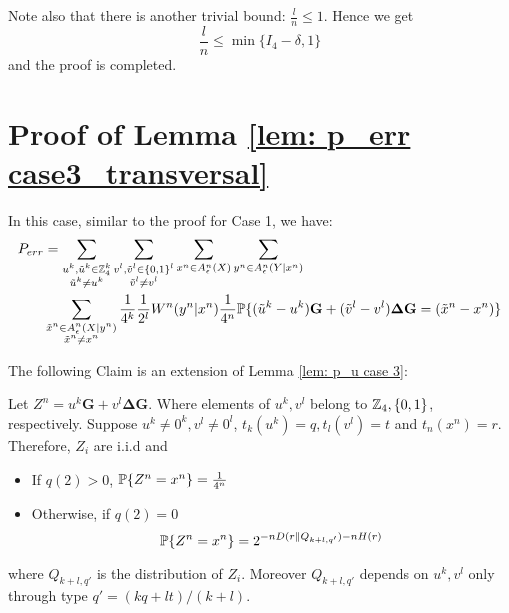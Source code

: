 Note also that there is  another trivial bound:  $\frac{l}{n} \leq 1$. Hence we get 
\begin{equation*}
\frac{l}{n}\leq \min \{I_4-\delta,1\}
\end{equation*}
and the proof is completed.





\section{Proof of Lemma \ref{lem: p_err case3_transversal}} \label{sec: proof of case 3 transversal}

In this case, similar to the proof for  Case 1, we have:
\begin{align}\label{equ: p_err case 3, transversal}\nonumber
P_{err}&=\sum_{\substack{u^k, \tilde{u}^k \in \mathbb{Z}_4^k\\ \tilde{u}^k \neq u^k}} \sum_{\substack{v^l, \tilde{v}^l \in \{0, 1\}^l\\ \tilde{v}^l \neq v^l}}  \sum_{x^n\in A_\epsilon^n(X)} \sum_{y^n\in A_\epsilon^n(Y|x^n)} \\ 
&\sum_{\substack{\tilde{x}^n\in A_\epsilon^n(X|y^n) \\ \tilde{x}^n\neq x^n}} \frac{1}{4^k} \frac{1}{2^l} W^n(y^n|x^n) \frac{1}{4^n}\mathbb{P}\{ (\tilde{u}^k-u^k)\mathbf{G}+(\tilde{v}^l-v^l)\mathbf{\Delta G}=(\tilde{x}^n-x^n)\}
\end{align} 

The following Claim is an extension of Lemma  \ref{lem: p_u case 3}:

\begin{claim}
Let $Z^n=u^k\mathbf{G}+v^l\mathbf{\Delta G}$. Where elements of $u^k, v^l$ belong to $\mathbb{Z}_4, \{0,1 \}$, respectively. Suppose $u^k \neq 0^k, v^l\neq 0^l$,  $t_k(u^k)=q, t_l(v^l)=t$ and $t_n(x^n)=r$. Therefore, $Z_i$ are i.i.d and

\begin{itemize}
\item If $q(2)>0$, $\mathbb{P}\{ Z^n=x^n\}=\frac{1}{4^n}$
\item Otherwise, if $q(2)=0$ 
\begin{equation}
\mathbb{P}\{ Z^n=x^n\}=2^{-nD(r\| Q_{k+l,q'})-nH(r)}
\end{equation}
\end{itemize}

where $Q_{k+l,q'}$ is the distribution of $Z_i$. Moreover $Q_{k+l,q'}$ depends on $u^k, v^l$ only through  type $q'=(kq+lt)/(k+l)$.
\end{claim}


